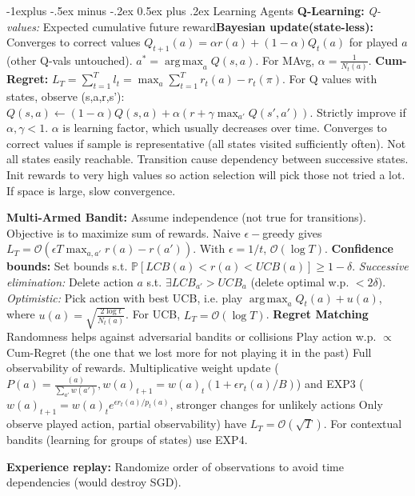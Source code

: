 \documentclass{article}
\makeatletter
\DeclareMathOperator*{\argmax}{arg\,max}
\renewcommand{\subsection}{\@startsection{subsection}{2}{0mm}%
                                {-1explus -.5ex minus -.2ex}%
                                {0.5ex plus .2ex}%
                                {\color{blue}\normalfont\scriptsize\bfseries}}
\newcommand{\disadv}[1]{{\color{red} #1}}
\newcommand{\adv}[1]{{\color{green!60!blue} #1}}
\makeatother
\begin{document}
\begin{multicols*}{4}
\subsection{Learning Agents}
\textbf{Q-Learning:} \textit{Q-values: }Expected cumulative future reward\textbf{Bayesian update(state-less):} Converges to correct values $Q_{t+1}(a)=\alpha r(a)+(1-\alpha)Q_t(a)$ for played $a$ (other Q-vals untouched). $a^*  = \argmax_a Q(s,a)$. For MAvg, $\alpha = \frac{1}{N_t(a)}$. \textbf{Cum-Regret:} $L_T=\sum_{t=1}^T l_t=\max_a \sum_{t=1}^Tr_t(a)-r_t(\pi) $. 
For Q values with states, observe (s,a,r,s'): $Q(s,a)\leftarrow (1-\alpha)Q(s,a)+\alpha(r+\gamma \max_{a'}Q(s',a'))$. Strictly improve if $\alpha, \gamma < 1$. $\alpha$ is learning factor, which usually decreases over time. \adv{Converges to correct values if sample is representative (all states visited sufficiently often)}. \disadv{Not all states easily reachable. Transition cause dependency between successive states}. Init rewards to very high values so action selection will pick those not tried a lot. \disadv{If space is large, slow convergence}.

\textbf{Multi-Armed Bandit:} \disadv{Assume independence (not true for transitions)}. Objective is to maximize sum of rewards. Naive $\epsilon-$greedy gives $L_T=\mathcal{O}(\epsilon T\max_{a,a'}r(a)-r(a'))$. With $\epsilon=1/t$, $\mathcal{O}(\log T)$. \textbf{Confidence bounds: }Set bounds s.t. $\mathbb{P}[LCB(a)< r(a)<UCB(a)]\geq 1-\delta$. \textit{Successive elimination: }Delete action $a$ s.t. $\exists LCB_{a'}>UCB_a$ (delete optimal w.p. $<2\delta$). 
\textit{Optimistic: }Pick action with best UCB, i.e. play $\argmax_a Q_t(a)+u(a)$, where $u(a)=\sqrt{\frac{2\log t}{N_t(a)}}$. For UCB, $L_T=\mathcal{O}(\log T)$. \textbf{Regret Matching} \adv{Randomness helps against adversarial bandits or collisions} Play action w.p. $\propto$ Cum-Regret (the one that we lost more for not playing it in the past) \disadv{Full observability of rewards}. Multiplicative weight update ($P(a) = \frac{(a)}{\sum_{a'} w(a')}, w(a)_{t+1} = w(a)_t (1+\epsilon r_t(a)/B)$) and EXP3 ($w(a)_{t+1} = w(a)_t e^{\epsilon r_t(a)/p_t(a)}$, stronger changes for unlikely actions \adv{Only observe played action, partial observability}) have $L_T=\mathcal{O}(\sqrt{T})$. For contextual bandits (learning for groups of states) use EXP4.

\textbf{Experience replay:} Randomize order of observations to avoid time dependencies (would destroy SGD).

\end{multicols*}
\end{document}
